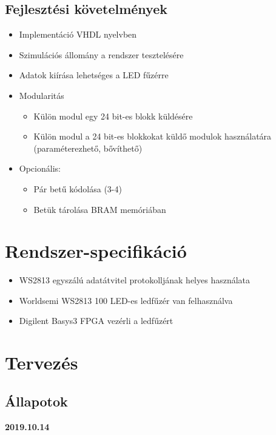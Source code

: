 \documentclass[10pt]{article} %
\begin{document}
\subsection{Fejlesztési követelmények}
\begin{itemize}
\item Implementáció VHDL nyelvben
\item Szimulációs állomány a rendszer tesztelésére
\item Adatok kiírása lehetséges a LED fűzérre
\item Modularitás
\begin{itemize}
	\item Külön modul egy 24 bit-es blokk küldésére
	\item Külön modul a 24 bit-es blokkokat küldő modulok használatára (paraméterezhető, bővíthető)
\end{itemize}
\item Opcionális: 
\begin{itemize}
	\item Pár betű kódolása (3-4)
	\item Betük tárolása BRAM memóriában
\end{itemize}
\end{itemize}

\section{Rendszer-specifikáció}

\begin{itemize}
\item WS2813 egyszálú adatátvitel protokolljának helyes használata
\item Worldsemi WS2813 100 LED-es ledfűzér van felhasználva
\item Digilent Basys3 FPGA vezérli a ledfűzért 
\end{itemize}

\section{Tervezés}

\subsection{Állapotok}

\textbf{2019.10.14}
\end{document}
